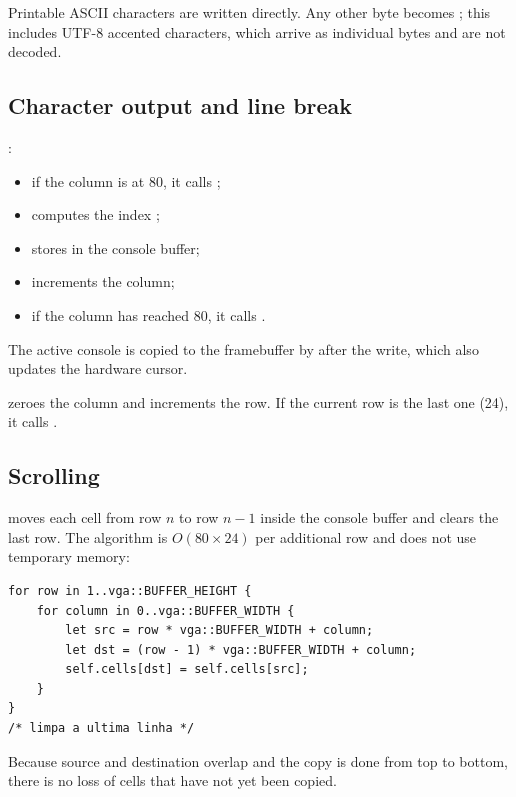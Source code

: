 Printable ASCII characters are written directly. Any other
byte becomes ; this includes UTF-8 accented characters, which arrive as
individual bytes and are not decoded.

\subsection{Character output and line break}

:

\begin{itemize}
  \item if the column is at 80, it calls ;
  \item computes the index ;
  \item stores  in the console buffer;
  \item increments the column;
  \item if the column has reached 80, it calls .
\end{itemize}

The active console is copied to the framebuffer by  after
the write, which also updates the hardware cursor.

 zeroes the column and increments the row. If the current row is the
last one (24), it calls .

\subsection{Scrolling}

 moves each cell from row $n$ to row $n-1$ inside the console
buffer and clears the last row. The algorithm is $O(80 \times 24)$ per
additional row and does not use temporary memory:

\begin{lstlisting}[caption={Core of the scrolling.},label={lst:scroll}]
for row in 1..vga::BUFFER_HEIGHT {
    for column in 0..vga::BUFFER_WIDTH {
        let src = row * vga::BUFFER_WIDTH + column;
        let dst = (row - 1) * vga::BUFFER_WIDTH + column;
        self.cells[dst] = self.cells[src];
    }
}
/* limpa a ultima linha */
\end{lstlisting}

Because source and destination overlap and the copy is done from top to bottom,
there is no loss of cells that have not yet been copied.

